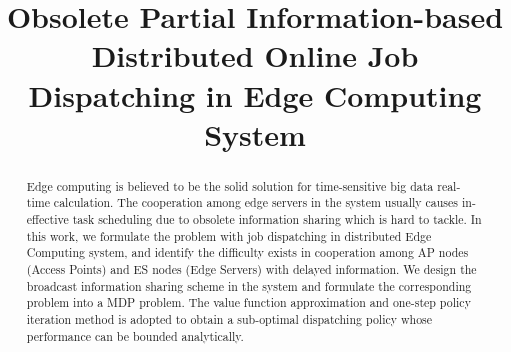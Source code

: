 \documentclass[10pt, conference, letterpaper]{IEEEtran}
\begin{document}
    \title{
        Obsolete Partial Information-based Distributed Online Job Dispatching in Edge Computing System
    }
    \maketitle

    \begin{abstract}
        \label{sec:abstract}
        Edge computing is believed to be the solid solution for time-sensitive big data real-time calculation. The cooperation among edge servers in the system usually causes in-effective task scheduling due to obsolete information sharing which is hard to tackle.
        In this work, we formulate the problem with job dispatching in distributed Edge Computing system, and identify the difficulty exists in cooperation among AP nodes (Access Points) and ES nodes (Edge Servers) with delayed information. We design the broadcast information sharing scheme in the system and formulate the corresponding problem into a MDP problem. The value function approximation and one-step policy iteration method is adopted to obtain a sub-optimal dispatching policy whose performance can be bounded analytically.
    \end{abstract}

\end{document}
